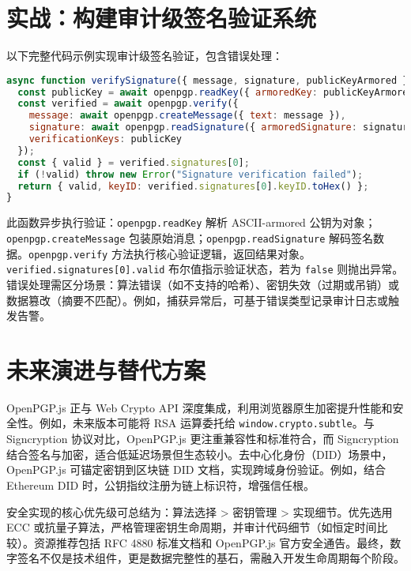 \chapter{实战：构建审计级签名验证系统}
以下完整代码示例实现审计级签名验证，包含错误处理：\par
\begin{lstlisting}[language=javascript]
async function verifySignature({ message, signature, publicKeyArmored }) {
  const publicKey = await openpgp.readKey({ armoredKey: publicKeyArmored });
  const verified = await openpgp.verify({
    message: await openpgp.createMessage({ text: message }),
    signature: await openpgp.readSignature({ armoredSignature: signature }),
    verificationKeys: publicKey
  });
  const { valid } = verified.signatures[0];
  if (!valid) throw new Error("Signature verification failed");
  return { valid, keyID: verified.signatures[0].keyID.toHex() };
}
\end{lstlisting}
此函数异步执行验证：\texttt{openpgp.readKey} 解析 ASCII-armored 公钥为对象；\texttt{openpgp.createMessage} 包装原始消息；\texttt{openpgp.readSignature} 解码签名数据。\texttt{openpgp.verify} 方法执行核心验证逻辑，返回结果对象。\texttt{verified.signatures[0].valid} 布尔值指示验证状态，若为 \texttt{false} 则抛出异常。错误处理需区分场景：算法错误（如不支持的哈希）、密钥失效（过期或吊销）或数据篡改（摘要不匹配）。例如，捕获异常后，可基于错误类型记录审计日志或触发告警。\par
\chapter{未来演进与替代方案}
OpenPGP.js 正与 Web Crypto API 深度集成，利用浏览器原生加密提升性能和安全性。例如，未来版本可能将 RSA 运算委托给 \texttt{window.crypto.subtle}。与 Signcryption 协议对比，OpenPGP.js 更注重兼容性和标准符合，而 Signcryption 结合签名与加密，适合低延迟场景但生态较小。去中心化身份（DID）场景中，OpenPGP.js 可锚定密钥到区块链 DID 文档，实现跨域身份验证。例如，结合 Ethereum DID 时，公钥指纹注册为链上标识符，增强信任根。\par
安全实现的核心优先级可总结为：算法选择 > 密钥管理 > 实现细节。优先选用 ECC 或抗量子算法，严格管理密钥生命周期，并审计代码细节（如恒定时间比较）。资源推荐包括 RFC 4880 标准文档和 OpenPGP.js 官方安全通告。最终，数字签名不仅是技术组件，更是数据完整性的基石，需融入开发生命周期每个阶段。\par
